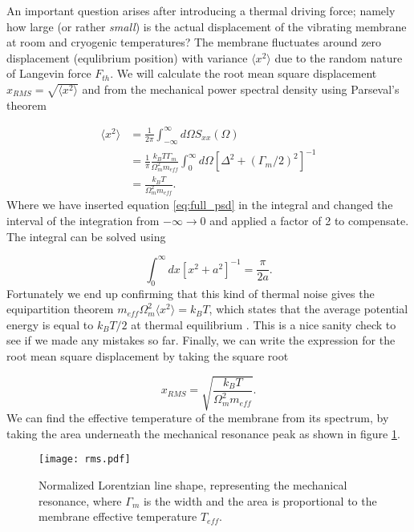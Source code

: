 An important question arises after introducing a thermal driving force; namely how large (or rather {\it{small}}) is the actual displacement of the vibrating membrane at room and cryogenic temperatures? The membrane fluctuates around zero displacement (equlibrium position) with variance $\langle x^2 \rangle$ due to the random nature of Langevin force $F_{th}$. We will calculate the root mean square displacement $x_{RMS} = \sqrt{\langle x^2 \rangle}$ and from the mechanical power spectral density using Parseval's theorem

\begin{equation}
\begin{split}
\langle x^2 \rangle & = \frac{1}{2\pi}\int_{-\infty}^{\infty}d\Omega S_{xx}(\Omega) \\
 & = \frac{1}{\pi}\frac{k_BT\Gamma_m}{\Omega_{m}^2m_{eff}}\int_{0}^{\infty}d\Omega\left[ \Delta^2 + (\Gamma_m/2)^2 \right]^{-1} \\
 & = \frac{k_BT}{\Omega_{m}^2m_{eff}} \label{eq:t_eff}.
\end{split}
\end{equation}
\noindent
Where we have inserted equation \eqref{eq:full_psd} in the integral and changed the interval of the integration from $-\infty \to 0$ and applied a factor of 2 to compensate. The integral can be solved using \cite{spiegel1999}

\begin{equation}
\int_{0}^{\infty}dx\left[x^2 + a^2 \right]^{-1} = \frac{\pi}{2a}.
\end{equation}
\noindent
Fortunately we end up confirming that this kind of thermal noise gives the equipartition theorem $m_{eff}\Omega_{m}^2\langle x^2 \rangle = k_BT$, which states that the average potential energy is equal to $k_BT/2$ at thermal equilibrium . This is a nice sanity check to see if we made any mistakes so far. Finally, we can write the expression for the root mean square displacement by taking the square root

\begin{equation}
x_{RMS} = \sqrt{\frac{k_BT}{\Omega_{m}^2m_{eff}}}.
\label{eq:rms}
\end{equation}
\noindent
We can find the effective temperature of the membrane from its spectrum, by taking the area underneath the mechanical resonance peak as shown in figure \ref{fig:mem_temp}.

\begin{figure}[H]
\centering
\texttt{[image: rms.pdf]}
\caption{Normalized Lorentzian line shape, representing the mechanical resonance, where $\Gamma_m$ is the width and the area is proportional to the membrane effective temperature $T_{eff}$.}
\label{fig:mem_temp}
\end{figure}

